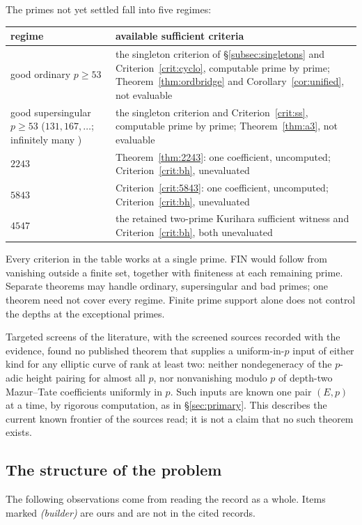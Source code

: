The primes not yet settled fall into five regimes:

\begin{center}
\begin{tabular}{@{}p{}p{}@{}}
\toprule
regime & available sufficient criteria\\ \midrule
good ordinary $p\ge53$ & the singleton criterion of \S\ref{subsec:singletons} and Criterion~\ref{crit:cyclo}, computable prime by prime; Theorem~\ref{thm:ordbridge} and Corollary~\ref{cor:unified}, not evaluable\\
good supersingular $p\ge53$ ($131,167,\dots$; infinitely many \cite{elkies}) & the singleton criterion and Criterion~\ref{crit:ss}, computable prime by prime; Theorem~\ref{thm:a3}, not evaluable\\
$2243$ & Theorem~\ref{thm:2243}: one coefficient, uncomputed; Criterion~\ref{crit:bh}, unevaluated\\
$5843$ & Criterion~\ref{crit:5843}: one coefficient, uncomputed; Criterion~\ref{crit:bh}, unevaluated\\
$4547$ & the retained two-prime Kurihara sufficient witness and Criterion~\ref{crit:bh}, both unevaluated\\ \bottomrule
\end{tabular}
\end{center}
Every criterion in the table works at a single prime. FIN would follow from vanishing outside a finite set, together with finiteness at each remaining prime. Separate theorems may handle ordinary, supersingular and bad primes; one theorem need not cover every regime. Finite prime support alone does not control the depths at the exceptional primes.

Targeted screens of the literature, with the screened sources recorded with the evidence, found no published theorem that supplies a uniform-in-$p$ input of either kind for any elliptic curve of rank at least two: neither nondegeneracy of the $p$-adic height pairing for almost all $p$, nor nonvanishing modulo $p$ of depth-two Mazur--Tate coefficients uniformly in $p$. Such inputs are known one pair $(E,p)$ at a time, by rigorous computation, as in \S\ref{sec:primary}. This describes the current known frontier of the sources read; it is not a claim that no such theorem exists.

\subsection{The structure of the problem}
The following observations come from reading the record as a whole. Items marked \emph{(builder)} are ours and are not in the cited records.

